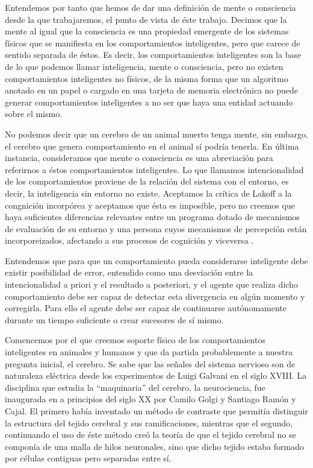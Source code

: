 \documentclass[12pt]{memoir}
\begin{document}
Entendemos por tanto que hemos de dar una definición de mente o consciencia desde la que trabajaremos, el punto de vista de éste trabajo. Decimos que la mente al igual que la consciencia es una propiedad emergente de los sistemas físicos que se manifiesta en los comportamientos inteligentes, pero que carece de sentido separada de éstos. Es decir, los comportamientos inteligentes son la base de lo que podemos llamar inteligencia, mente o consciencia, pero no existen comportamientos inteligentes no físicos, de la misma forma que un algoritmo anotado en un papel o cargado en una tarjeta de memoria electrónica no puede generar comportamientos inteligentes a no ser que haya una entidad actuando sobre el mismo. 

\nocite{newmind}

No podemos decir que un cerebro de un animal muerto tenga mente, sin embargo, el cerebro que genera comportamiento en el animal sí podría tenerla. En última instancia, consideramos que mente o consciencia es una abreviación para referirnos a éstos comportamientos inteligentes. Lo que llamamos intencionalidad de los comportamientos proviene de la relación del sistema con el entorno, es decir, la inteligencia sin entorno no existe. Aceptamos la crítica de Lakoff a la congnición incorpórea y aceptamos que ésta es imposible, pero no creemos que haya suficientes diferencias relevantes entre un programa dotado de mecanismos de evaluación de su entorno y una persona cuyos mecanismos de percepción están incorporeizados, afectando a sus procesos de cognición y viceversa \parencite{lakoff}. 

Entendemos que para que un comportamiento pueda considerarse inteligente debe existir posibilidad de error, entendido como una desviación entre la intencionalidad a priori y  el resultado a posteriori, y el agente que realiza dicho comportamiento debe ser capaz de detectar esta divergencia en algún momento y corregirla. Para ello el agente debe ser capaz de continuarse autónomamente durante un tiempo suficiente o crear sucesores de sí mismo.

Comencemos por el que creemos soporte físico de los comportamientos inteligentes en animales y humanos y que da partida probablemente a nuestra pregunta inicial, el cerebro. Se sabe que las señales del sistema nervioso son de naturaleza eléctrica desde los experimentos de Luigi Galvani en el siglo XVIII. La disciplina que estudia la ``maquinaria'' del cerebro, la neurociencia, fue inaugurada en a principios del siglo XX por Camilo Golgi y Santiago Ramón y Cajal. El primero había inventado un método de contraste que permitía distinguir la estructura del tejido cerebral y sus ramificaciones, mientras que el segundo, continuando el uso de éste método creó la teoría de que el tejido cerebral no se componía de una malla de hilos neuronales, sino que dicho tejido estaba formado por células contiguas pero separadas entre sí. 
\end{document}
